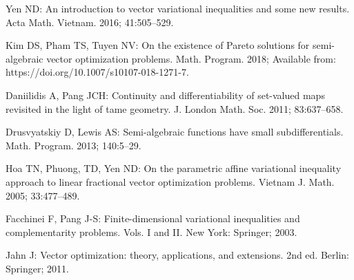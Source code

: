 \documentclass[]{interact}
\theoremstyle{plain}%
\theoremstyle{definition}
\begin{document}
\begin{thebibliography}{99}
 Yen ND: An introduction to vector variational inequalities and some new results. Acta Math. Vietnam. 2016; 41:505--529.

 Kim DS, Pham TS, Tuyen NV: On the existence of Pareto solutions for semi-algebraic vector optimization problems. Math. Program. 2018; Available from: https://doi.org/10.1007/s10107-018-1271-7.

 Daniilidis A, Pang JCH: Continuity and differentiability of set-valued maps revisited in the light of tame geometry. J. London Math. Soc. 2011; 83:637--658.

  Drusvyatskiy D,  Lewis AS:  Semi-algebraic functions have small subdifferentials.  Math. Program. 2013; 140:5--29.

 Hoa TN, Phuong, TD, Yen ND: On the parametric affine variational inequality approach to linear fractional vector optimization problems. Vietnam J. Math. 2005; 33:477--489.

 Facchinei F, Pang J-S: Finite-dimensional variational inequalities and complementarity problems. {Vols. I and II.} New York: Springer;  2003.


 Jahn J: Vector optimization: theory, applications, and extensions. 2nd ed. Berlin: Springer; 2011.

\end{thebibliography}
\end{document}
